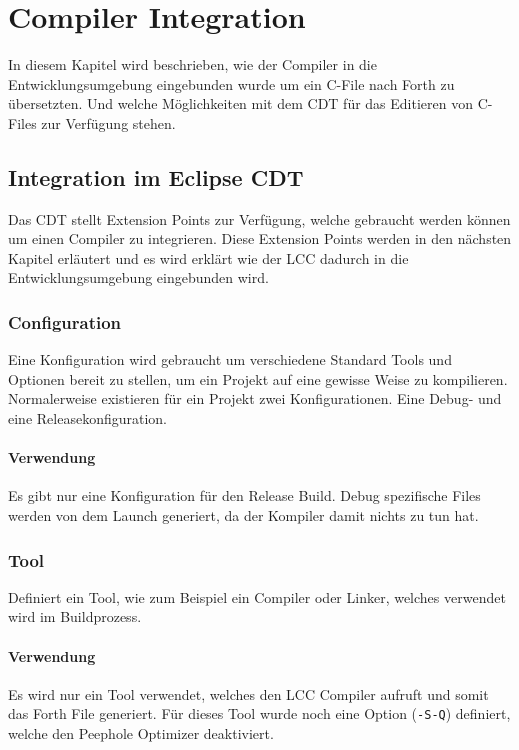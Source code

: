 \chapter{Compiler Integration}
\label{compilerintegration}

In diesem Kapitel wird beschrieben, wie der Compiler in die Entwicklungsumgebung eingebunden wurde um ein C-File nach Forth zu übersetzten. Und welche Möglichkeiten mit dem CDT für das Editieren von C-Files zur Verfügung stehen.

\section{Integration im Eclipse CDT}

Das CDT stellt Extension Points zur Verfügung, welche gebraucht werden können um einen Compiler zu integrieren. Diese Extension Points werden in den nächsten Kapitel erläutert und es wird erklärt wie der LCC dadurch in die Entwicklungsumgebung eingebunden wird.

\subsection{Configuration}

Eine Konfiguration wird gebraucht um verschiedene Standard Tools und Optionen bereit zu stellen, um ein Projekt auf eine gewisse Weise zu kompilieren. Normalerweise existieren für ein Projekt zwei Konfigurationen. Eine Debug- und eine Releasekonfiguration.

\subsubsection{Verwendung}
Es gibt nur eine Konfiguration für den Release Build. Debug spezifische Files werden von dem Launch generiert, da der Kompiler damit nichts zu tun hat.

\subsection{Tool}
Definiert ein Tool, wie zum Beispiel ein Compiler oder Linker, welches verwendet wird im Buildprozess.

\subsubsection{Verwendung}
Es wird nur ein Tool verwendet, welches den LCC Compiler aufruft und somit das Forth File generiert. Für dieses Tool wurde noch eine Option (\verb!-S-Q!) definiert, welche den Peephole Optimizer deaktiviert.


